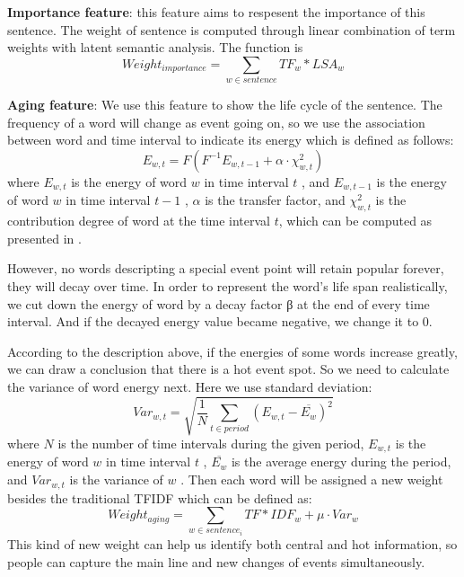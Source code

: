 \documentclass{llncs}
\begin{document}
\textbf{Importance feature}: this feature aims to respesent the importance of this sentence. The weight of sentence is computed through linear combination of term weights with latent semantic analysis. The function is 
\begin{equation}
Weight_{importance} = \sum_{w \in sentence}TF_w * LSA_w
\end{equation}

\textbf{Aging feature}: We use this feature to show the life cycle of the sentence. The frequency of a word will change as event going on, so we use the association between word  and time interval  to indicate its energy which is defined as follows:
\begin{equation}
  E_{w,t} =F(F^{-1}E_{w,t-1}+\alpha\cdot\chi^2_{w,t})
\end{equation}
where $E_{w,t}$ is the energy of word $w$  in time interval $t$ , and $E_{w,t-1}$  is the energy of word $w$ in time interval $t-1$ , $\alpha$ is the transfer factor, and $\chi^2_{w,t}$  is the contribution degree of word  at the time interval $t$, which can be computed as presented in \cite{2000-Swan-p49-56}. 

However, no words descripting a special event point will retain popular forever, they will decay over time. In order to represent the word's life span realistically, we cut down the energy of word by a decay factor β at the end of every time interval. And if the decayed energy value became negative, we change it to 0.

According to the description above, if the energies of some words increase greatly, we can draw a conclusion that there is a hot event spot. So we need to calculate the variance of word energy next. Here we use standard deviation:
\begin{equation}
Var_{w,t} = \sqrt{ \frac{1}{N} \sum_{t \in period}(E_{w,t}- \overline{E_{w}})^2}
\end{equation}
where $N$ is the number of time intervals during the given period, $E_{w,t}$  is the energy of word $w$  in time interval $t$ , $\overline{E_{w}}$  is the average energy during the period, and $Var_{w,t}$  is the variance of $w$ .
Then each word will be assigned a new weight besides the traditional TFIDF which can be defined as:
 \begin{equation}
Weight_{aging}=\sum_{w \in sentence_i}TF*IDF_{w} + \mu \cdot Var_{w}
\end{equation}
This kind of new weight can help us identify both central and hot information, so people can capture the main line and new changes of events simultaneously.
\end{document}
